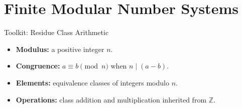 \section{Finite Modular Number Systems}
\begin{toolkitbox}{Toolkit: Residue Class Arithmetic}
\begin{itemize}
  \item \textbf{Modulus:} a positive integer \(n\).
  \item \textbf{Congruence:} \(a\equiv b\pmod n\) when \(n\mid(a-b)\).
  \item \textbf{Elements:} equivalence classes of integers modulo \(n\).
  \item \textbf{Operations:} class addition and multiplication inherited from \(\mathbb{Z}\).
\end{itemize}
\end{toolkitbox}


